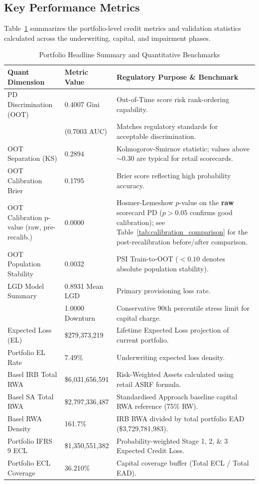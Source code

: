 \documentclass[11pt,a4paper]{article}
\begin{document}
\subsection{Key Performance Metrics}
Table~\ref{tab:exec_summary} summarizes the portfolio-level credit metrics and validation statistics calculated across the underwriting, capital, and impairment phases.

\begin{table}[h]
\centering
\caption{Portfolio Headline Summary and Quantitative Benchmarks}
\label{tab:exec_summary}
\vspace{0.5em}
\begin{tabular}{p{3.8cm}p{3.2cm}p{9.0cm}}
\toprule
\textbf{Quant Dimension} & \textbf{Metric Value} & \textbf{Regulatory Purpose \& Benchmark} \\
\midrule
PD Discrimination (OOT) & 0.4007 Gini & Out-of-Time score risk rank-ordering capability. \\
& (0.7003 AUC) & Matches regulatory standards for acceptable discrimination. \\
OOT Separation (KS) & 0.2894 & Kolmogorov-Smirnov statistic; values above $\sim 0.30$ are typical for retail scorecards. \\
OOT Calibration Brier & 0.1795 & Brier score reflecting high probability accuracy. \\
OOT Calibration p-value (raw, pre-recalib.) & 0.0000 & Hosmer-Lemeshow $p$-value on the \textbf{raw} scorecard PD ($p > 0.05$ confirms good calibration); see Table~\ref{tab:calibration_comparison} for the post-recalibration before/after comparison. \\
OOT Population Stability & 0.0032 & PSI Train-to-OOT ($< 0.10$ denotes absolute population stability). \\
\midrule
LGD Model Summary & 0.8931 Mean LGD & Primary provisioning loss rate. \\
& 1.0000 Downturn & Conservative 90th percentile stress limit for capital charge. \\
\midrule
Expected Loss (EL) & \$279,373,219 & Lifetime Expected Loss projection of current portfolio. \\
Portfolio EL Rate & 7.49\% & Underwriting expected loss density. \\
\midrule
Basel IRB Total RWA & \$6,031,656,591 & Risk-Weighted Assets calculated using retail ASRF formula. \\
Basel SA Total RWA & \$2,797,336,487 & Standardised Approach baseline capital RWA reference (75\% RW). \\
Basel RWA Density & 161.7\% & IRB RWA divided by total portfolio EAD (\$3,729,781,983). \\
\midrule
Portfolio IFRS 9 ECL & \$1,350,551,382 & Probability-weighted Stage 1, 2, \& 3 Expected Credit Loss. \\
Portfolio ECL Coverage & 36.210\% & Capital coverage buffer (Total ECL / Total EAD). \\
\bottomrule
\end{tabular}
\end{table}
\end{document}
